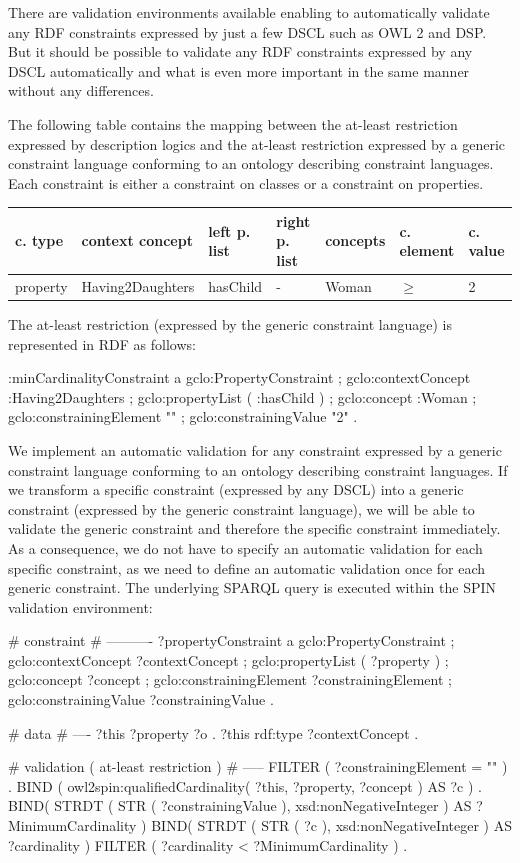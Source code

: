 \documentclass{llncs}
\newenvironment{gcotable}{
  \scriptsize
  \sffamily
  \vspace{0.3cm}
  \begin{tabular}{l|l|l|l|l|l|l}
  \hline
  \textbf{c. type} & \textbf{context concept} & \textbf{left p. list} & \textbf{right p. list} & \textbf{concepts} & \textbf{c. element} & \textbf{c. value} \\
  \hline

}{
  \hline
  \end{tabular}
  \linebreak
}
\begin{document}
There are validation environments available enabling to automatically validate any RDF constraints expressed by just a few DSCL such as OWL 2 and DSP.
But it should be possible to validate any RDF constraints expressed by any DSCL automatically and what is even more important in the same manner without any differences.  

The following table contains the mapping between the at-least restriction expressed by description logics and the at-least restriction expressed by a generic constraint language conforming to an ontology describing constraint languages.
Each constraint is either a constraint on classes or a constraint on properties.

\begin{gcotable}
property & Having2Daughters & hasChild & - & Woman & $\geq$ & 2 \\
\end{gcotable}


The at-least restriction (expressed by the generic constraint language) is represented in RDF as follows:

\begin{ex}
:minCardinalityConstraint
    a gclo:PropertyConstraint ;
    gclo:contextConcept :Having2Daughters ;
    gclo:propertyList ( :hasChild ) ;
    gclo:concept :Woman ;
    gclo:constrainingElement "\geq" ;
    gclo:constrainingValue "2" .
\end{ex}

We implement an automatic validation for any constraint expressed by a generic constraint language conforming to an ontology describing constraint languages.
If we transform a specific constraint (expressed by any DSCL) into a generic constraint (expressed by the generic constraint language), we will be able to validate the generic constraint and therefore the specific constraint immediately. 
As a consequence, we do not have to specify an automatic validation for each specific constraint, as we need to define an automatic validation once for each generic constraint. The underlying SPARQL query is executed within the SPIN validation environment:

\begin{ex}
# constraint
# ----------
?propertyConstraint
    a gclo:PropertyConstraint ;
    gclo:contextConcept ?contextConcept ;
    gclo:propertyList ( ?property ) ;
    gclo:concept ?concept ;
    gclo:constrainingElement ?constrainingElement ;
    gclo:constrainingValue ?constrainingValue .
		
# data
# ----
?this ?property ?o .
?this rdf:type ?contextConcept .

# validation ( at-least restriction )
# -----
FILTER ( ?constrainingElement = "\geq" ) .
BIND ( owl2spin:qualifiedCardinality( ?this, ?property, ?concept ) AS ?c ) .
BIND( STRDT ( STR ( ?constrainingValue ), xsd:nonNegativeInteger ) AS ?MinimumCardinality )
BIND( STRDT ( STR ( ?c ), xsd:nonNegativeInteger ) AS ?cardinality )
FILTER ( ?cardinality < ?MinimumCardinality ) .		  
\end{ex}
\end{document}
